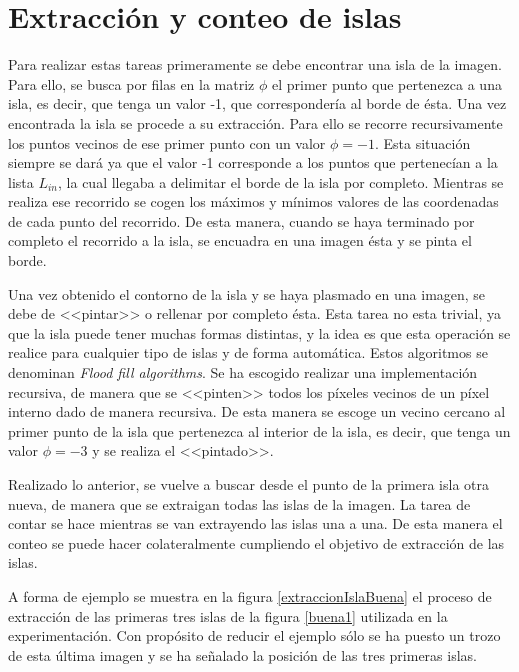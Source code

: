\section{Extracci\'{o}n y conteo de islas}

Para realizar estas tareas primeramente se debe encontrar una isla de la imagen. Para ello, se busca por filas en la matriz $\phi$ el primer punto que pertenezca a una isla, es decir, que tenga un valor -1, que corresponder\'{i}a al borde de \'{e}sta. Una vez encontrada la isla se procede a su extracci\'{o}n. Para ello se recorre recursivamente los puntos vecinos de ese primer punto con un valor $\phi = -1$. Esta situaci\'{o}n siempre se dar\'{a} ya que el valor -1 corresponde a los puntos que pertenec\'{i}an a la lista $L_{in}$, la cual llegaba a delimitar el borde de la isla por completo. Mientras se realiza ese recorrido se cogen los m\'{a}ximos y m\'{i}nimos valores de las coordenadas de cada punto del recorrido. De esta manera, cuando se haya terminado por completo el recorrido a la isla, se encuadra en una imagen \'{e}sta y se pinta el borde.

Una vez obtenido el contorno de la isla y se haya plasmado en una imagen, se debe de <<pintar>> o rellenar por completo \'{e}sta. Esta tarea no esta trivial, ya que la isla puede tener muchas formas distintas, y la idea es que esta operaci\'{o}n se realice para cualquier tipo de islas y de forma autom\'{a}tica. Estos algoritmos se denominan \textit{Flood fill algorithms}. Se ha escogido realizar una implementaci\'{o}n recursiva, de manera que se <<pinten>> todos los p\'{i}xeles vecinos de un p\'{i}xel interno dado de manera recursiva. De esta manera se escoge un vecino cercano al primer punto de la isla que pertenezca al interior de la isla, es decir, que tenga un valor $\phi = -3$ y se realiza el <<pintado>>.

Realizado lo anterior, se vuelve a buscar desde el punto de la primera isla otra nueva, de manera que se extraigan todas las islas de la imagen. La tarea de contar se hace mientras se van extrayendo las islas una a una. De esta manera el conteo se puede hacer colateralmente cumpliendo el objetivo de extracci\'{o}n de las islas.

A forma de ejemplo se muestra en la figura \ref{extraccionIslaBuena} el proceso de extracci\'{o}n de las primeras tres islas de la figura \ref{buena1} utilizada en la experimentaci\'{o}n. Con prop\'{o}sito de reducir el ejemplo s\'{o}lo se ha puesto un trozo de esta \'{u}ltima imagen y se ha se\~{n}alado la posici\'{o}n de las tres primeras islas.


